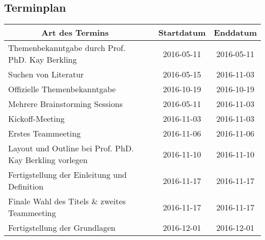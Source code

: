 \pagebreak
\subsection{Terminplan}
\begin{tabular}{|p{6cm}|p{3.5cm}|c|c|}
\hline
\multicolumn{1}{|c|}{\textbf{Art des Termins}}               & \centering{\textbf{Teilnehmer}}                                  &              \textbf{Startdatum} & \textbf{Enddatum} \\ \hline
Themenbekanntgabe durch Prof. PhD. Kay Berkling              & \centering{Kay Berkling, Marc Mahler}                            & 2016-05-11          & 2016-05-11        \\ \hline
Suchen von Literatur                                         & \centering{Marvin Zerulla}                                       & 2016-05-15          & 2016-11-03        \\ \hline
Offizielle Themenbekanntgabe                                 & \centering{Marc Mahler, Marvin Zerulla}                          & 2016-10-19          & 2016-10-19        \\ \hline
Mehrere Brainstorming  Sessions                              & \centering{Marc Mahler, Marvin Zerulla}                          & 2016-05-11          & 2016-11-03        \\ \hline
Kickoff-Meeting                                              & \centering{Marc Mahler, Marvin Zerulla, Prof. PhD. Kay Berkling} & 2016-11-03          & 2016-11-03        \\ \hline
Erstes Teammeeting                                           & \centering{Marc Mahler, Marvin Zerulla}                          & 2016-11-06          & 2016-11-06        \\ \hline
Layout und Outline bei Prof. PhD. Kay Berkling vorlegen      & \centering{Marc Mahler, Marvin Zerulla, Prof. PhD. Kay Berkling} & 2016-11-10          & 2016-11-10        \\ \hline
Fertigstellung der  Einleitung und  Definition               & \centering{Marc Mahler, Marvin Zerulla}                          & 2016-11-17          & 2016-11-17        \\ \hline
Finale Wahl des Titels \& zweites Teammeeting				 & \centering{Marc Mahler, Marvin Zerulla}							&
2016-11-17 			& 2016-11-17		\\ \hline
Fertigstellung der Grundlagen                                & \centering{Marc Mahler, Marvin Zerulla}                          & 2016-12-01          & 2016-12-01        \\ \hline
\end{tabular}

